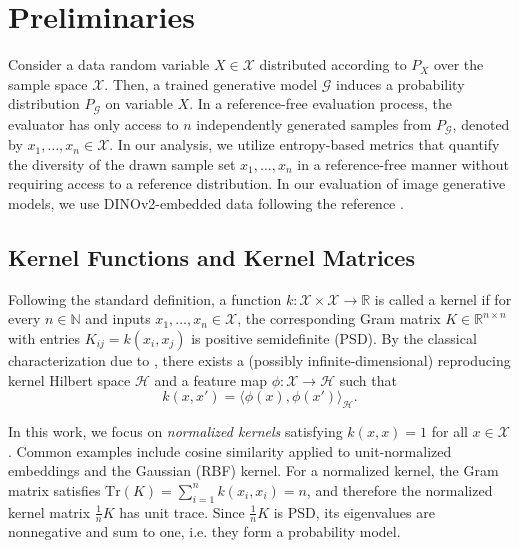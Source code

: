\documentclass{article}
\theoremstyle{plain}
\theoremstyle{definition}
\begin{document}
\section{Preliminaries}
Consider a data random variable $X\in \mathcal{X}$ distributed according to $P_X$ over the sample space $\mathcal{X}$.
Then, a trained generative model $\mathcal{G}$ induces a probability distribution $P_\mathcal{G}$ on variable $X$. In a reference-free evaluation process, the evaluator has only access to $n$ independently generated samples from $P_\mathcal{G}$, denoted by $x_1,\ldots,x_n \in \mathcal{X}$. 
In our analysis, we utilize entropy-based metrics that quantify the diversity of the drawn sample set $x_1,\ldots,x_n$ in a reference-free manner without requiring access to a reference distribution. In our evaluation of image generative models, we use DINOv2-embedded data following the reference \citep{stein_exposing_2023}.


\subsection{Kernel Functions and Kernel Matrices}
Following the standard definition, a function $k:\mathcal{X}\times\mathcal{X}\rightarrow\mathbb{R}$ is called a kernel if for every $n\in\mathbb{N}$ and inputs $x_1,\ldots,x_n\in\mathcal{X}$, the corresponding Gram matrix $K\in\mathbb{R}^{n\times n}$ with entries $K_{ij}=k(x_i,x_j)$ is positive semidefinite (PSD).
By the classical characterization due to \citet{aronszajn1950reproducing}, there exists a (possibly infinite-dimensional) reproducing kernel Hilbert space $\mathcal{H}$ and a feature map $\phi:\mathcal{X}\rightarrow\mathcal{H}$ such that
\begin{equation}\label{eq:kernel_feature_map}
    k(x,x') = \bigl\langle \phi(x), \phi(x') \bigr\rangle_{\mathcal{H}}.
\end{equation}

In this work, we focus on \textit{normalized kernels} satisfying $k(x,x)=1$ for all $x\in\mathcal{X}$.
Common examples include cosine similarity applied to unit-normalized embeddings and the Gaussian (RBF) kernel.
For a normalized kernel, the Gram matrix satisfies $\mathrm{Tr}(K)=\sum_{i=1}^n k(x_i,x_i)=n$, and therefore the normalized kernel matrix $\frac{1}{n}K$ has unit trace.
Since $\frac{1}{n}K$ is PSD, its eigenvalues are nonnegative and sum to one, i.e. they form a probability model.
\end{document}
